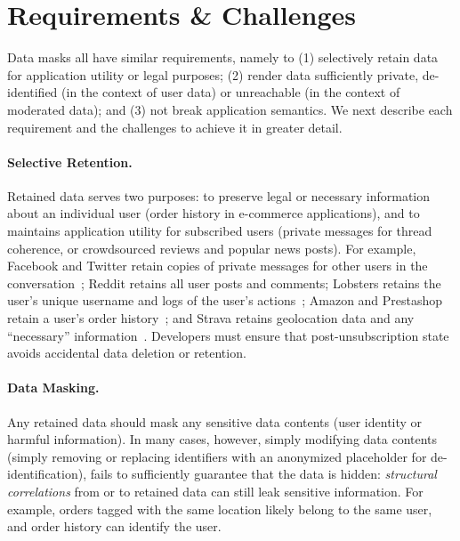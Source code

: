 \section{Requirements \& Challenges}

Data masks all have similar requirements, namely to (1) selectively
retain data for application utility or legal purposes; (2) render data sufficiently private, \ie
de-identified (in the context of user data) or unreachable (in the context of moderated data); and (3)
not break application semantics. We next describe each requirement and the challenges to achieve it
in greater detail.

%

\paragraph{Selective Retention.}
Retained data serves two purposes: to preserve legal or necessary information about an individual
user (\eg order history in e-commerce applications), and to maintains application utility for
subscribed users (\eg private messages for thread coherence, or crowdsourced reviews and popular
news posts).  For example, Facebook and Twitter retain copies of private messages for other users in
the conversation~\cite{facebook:privacy, twitter:privacy}; Reddit retains all user posts and comments;
Lobsters retains the user's unique username and logs of the user's actions~\cite{reddit:privacy};
Amazon and Prestashop retain a user's order history~\cite{amazon:privacy, prestashop:privacy}; and
Strava retains geolocation data and any ``necessary'' information~\cite{strava:privacy}. 
Developers must ensure that post-unsubscription state avoids accidental data deletion or retention.

\paragraph{Data Masking.}
Any retained data should mask any sensitive data contents (\eg user identity or harmful information). In many cases, however, simply modifying data contents (\eg simply removing or replacing
identifiers with an anonymized placeholder for de-identification), fails to sufficiently guarantee
that the data is hidden: \emph{structural correlations} from or to retained data can still leak sensitive
information. For example, orders tagged with the same location likely belong to the same user, and
order history can identify the user. 

